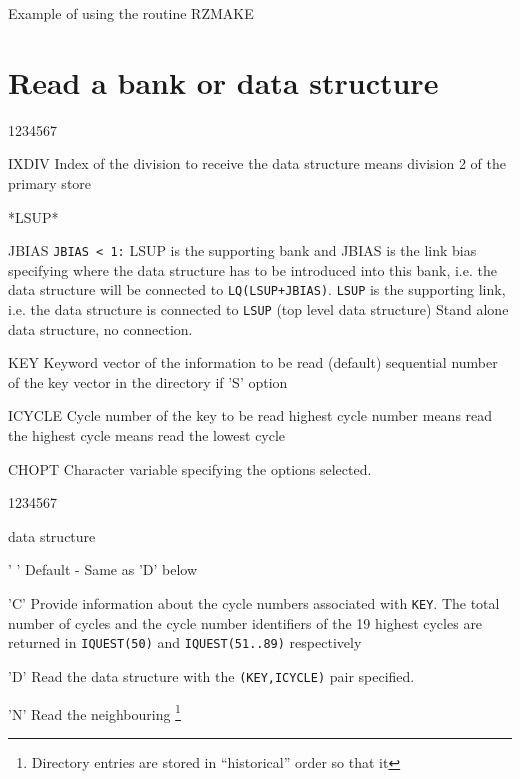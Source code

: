 \begin{XMPt}{Example of using the routine RZMAKE}
\section{Read a bank or data structure}
\Idesc
\begin{DLtt}{1234567}
\item[IXDIV]Index of the division to receive the data structure
 means division 2 of the primary store
\item[*LSUP*]
\item[JBIAS]{\tt JBIAS < 1:} LSUP is the supporting bank
and JBIAS is the link bias specifying where the data structure has to be
introduced into this bank, i.e. the data structure will be connected
to {\tt LQ(LSUP+JBIAS)}.
{\tt LSUP} is the supporting link, i.e. the data structure
is connected to {\tt LSUP} (top level data structure)
 Stand alone data structure, no connection.
\item[KEY]Keyword vector of the information to be read (default)
\newline sequential number of the key vector in the directory if 'S' option
\item[ICYCLE]Cycle number of the key to be read
 highest cycle number means read the highest cycle
 means read the lowest cycle
\item[CHOPT]Character variable specifying the options selected.
\begin{DLtt}{1234567}
\item[data structure]
\begin{DLtt}{12}
\item[' ']Default - Same as 'D' below
\item['C']Provide information about the cycle numbers associated with {\tt KEY}.
\newline The total number of cycles and the cycle number identifiers
of the 19 highest cycles are returned in {\tt IQUEST(50)} and
{\tt IQUEST(51..89)} respectively
\item['D']Read the data structure with the {\tt (KEY,ICYCLE)} pair specified.
\item['N']Read the neighbouring
\footnote{
Directory entries are stored in ``historical'' order so that it
}
\end{DLtt}
\end{DLtt}
\end{DLtt}
\end{XMPt}

